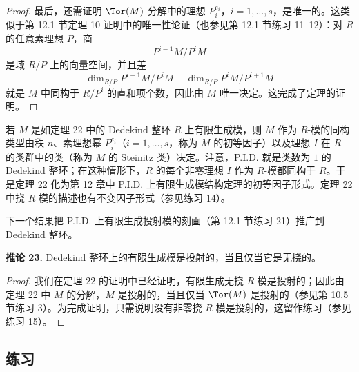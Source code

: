 \begin{proof}
最后，还需证明 $\Tor(M)$ 分解中的理想 $P_i^{e_i}$，$i=1,
\ldots,s$，是唯一的。这类似于第 12.1 节定理 10 证明中的唯一性论证（也参见第 12.1 节练习 11--12）：对 $R$ 的任意素理想 $P$，商
\[
  P^{i-1}M/P^iM
\]
是域 $R/P$ 上的向量空间，并且差
\[
  \dim_{R/P} P^{i-1}M/P^iM-
  \dim_{R/P} P^iM/P^{i+1}M
\]
就是 $M$ 中同构于 $R/P^i$ 的直和项个数，因此由 $M$ 唯一决定。这完成了定理的证明。
\end{proof}

若 $M$ 是如定理 22 中的 Dedekind 整环 $R$ 上有限生成模，则 $M$ 作为 $R$-模的同构类型由秩 $n$、素理想幂 $P_i^{e_i}$（$i=1,
\ldots,s$，称为 $M$ 的初等因子）以及理想 $I$ 在 $R$ 的类群中的类（称为 $M$ 的 Steinitz 类）决定。注意，P.I.D. 就是类数为 $1$ 的 Dedekind 整环；在这种情形下，$R$ 的每个非零理想 $I$ 作为 $R$-模都同构于 $R$。于是定理 22 化为第 12 章中 P.I.D. 上有限生成模结构定理的初等因子形式。定理 22 中挠 $R$-模的描述也有不变因子形式（参见练习 14）。

下一个结果把 P.I.D. 上有限生成投射模的刻画（第 12.1 节练习 21）推广到 Dedekind 整环。

\medskip
\noindent\textbf{推论 23.} Dedekind 整环上的有限生成模是投射的，当且仅当它是无挠的。

\begin{proof}
我们在定理 22 的证明中已经证明，有限生成无挠 $R$-模是投射的；因此由定理 22 中 $M$ 的分解，$M$ 是投射的，当且仅当 $\Tor(M)$ 是投射的（参见第 10.5 节练习 3）。为完成证明，只需说明没有非零挠 $R$-模是投射的，这留作练习（参见练习 15）。
\end{proof}

\subsection*{练习}

